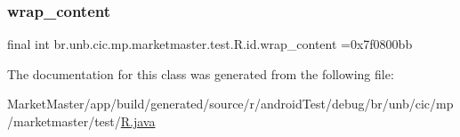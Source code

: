 \subsubsection{\texorpdfstring{wrap\+\_\+content}{wrap\_content}}
{\footnotesize\ttfamily final int br.\+unb.\+cic.\+mp.\+marketmaster.\+test.\+R.\+id.\+wrap\+\_\+content =0x7f0800bb\hspace{0.3cm}{\ttfamily [static]}}



The documentation for this class was generated from the following file\+:\begin{DoxyCompactItemize}
\item 
Market\+Master/app/build/generated/source/r/android\+Test/debug/br/unb/cic/mp/marketmaster/test/\mbox{\hyperlink{androidTest_2debug_2br_2unb_2cic_2mp_2marketmaster_2test_2R_8java}{R.\+java}}\end{DoxyCompactItemize}
